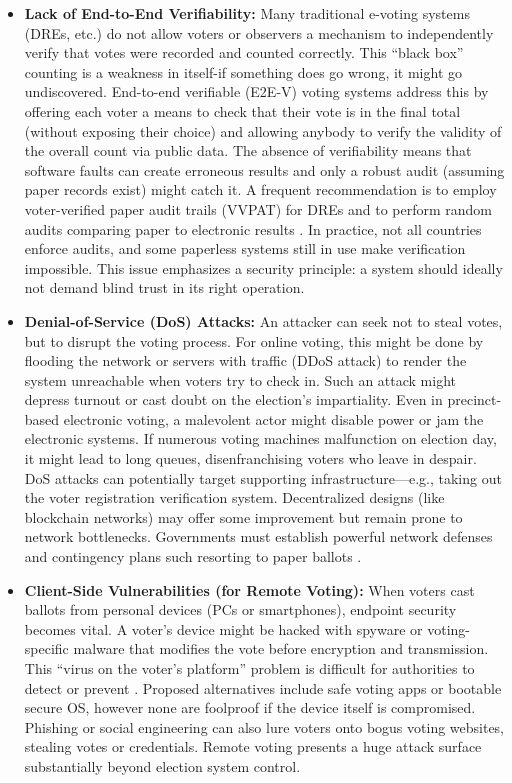 \documentclass[a4paper,10pt]{report}
\begin{document}
\begin{itemize}
     \item \textbf {Lack of End-to-End Verifiability:}  Many traditional e-voting systems (DREs, etc.) do not allow voters or observers a mechanism to independently verify that votes were recorded and counted correctly.  This “black box” counting is a weakness in itself-if something does go wrong, it might go undiscovered.  End-to-end verifiable (E2E-V) voting systems address this by offering each voter a means to check that their vote is in the final total (without exposing their choice) and allowing anybody to verify the validity of the overall count via public data.  The absence of verifiability means that software faults can create erroneous results and only a robust audit (assuming paper records exist) might catch it.  A frequent recommendation is to employ voter-verified paper audit trails (VVPAT) for DREs and to perform random audits comparing paper to electronic results \cite{brookings2017audits}.  In practice, not all countries enforce audits, and some paperless systems still in use make verification impossible.  This issue emphasizes a security principle: a system should ideally not demand blind trust in its right operation.
    
     \item \textbf {Denial-of-Service (DoS) Attacks:}  An attacker can seek not to steal votes, but to disrupt the voting process.  For online voting, this might be done by flooding the network or servers with traffic (DDoS attack) to render the system unreachable when voters try to check in.  Such an attack might depress turnout or cast doubt on the election’s impartiality.  Even in precinct-based electronic voting, a malevolent actor might disable power or jam the electronic systems.  If numerous voting machines malfunction on election day, it might lead to long queues, disenfranchising voters who leave in despair.  DoS attacks can potentially target supporting infrastructure—e.g., taking out the voter registration verification system.  Decentralized designs (like blockchain networks) may offer some improvement but remain prone to network bottlenecks.  Governments must establish powerful network defenses and contingency plans such resorting to paper ballots \cite{dos_attack_electronics}.
    
     \item \textbf {Client-Side Vulnerabilities (for Remote Voting):}  When voters cast ballots from personal devices (PCs or smartphones), endpoint security becomes vital.  A voter’s device might be hacked with spyware or voting-specific malware that modifies the vote before encryption and transmission.  This “virus on the voter’s platform” problem is difficult for authorities to detect or prevent \cite{dc_voting_trial}.  Proposed alternatives include safe voting apps or bootable secure OS, however none are foolproof if the device itself is compromised.  Phishing or social engineering can also lure voters onto bogus voting websites, stealing votes or credentials.  Remote voting presents a huge attack surface substantially beyond election system control.
    

\end{itemize}
\end{document}
